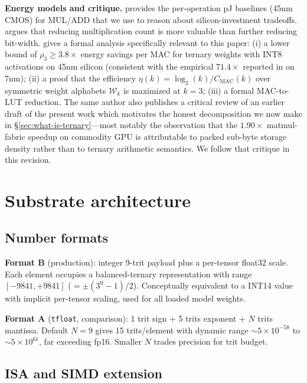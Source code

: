 \documentclass{article}
\begin{document}
\textbf{Energy models and critique.} \citet{horowitz-energy-2014}
provides the per-operation pJ baselines (45nm {CMOS}) for {MUL}/{ADD}
that we use to reason about silicon-investment tradeoffs.
\citet{prom-2025} argues that reducing multiplication count is more
valuable than further reducing bit-width.
\citet{cuevas-formal-2026} gives a formal analysis specifically
relevant to this paper: (i) a lower bound of $\rho_3 \geq 3.8\times$
energy savings per {MAC} for ternary weights with INT8 activations on
45nm silicon (consistent with the empirical $71.4\times$ reported in
\citep{bitnet158-2024} on 7nm); (ii) a proof that the efficiency
$\eta(k) = \log_2(k) / C_{\mathrm{MAC}}(k)$ over symmetric weight
alphabets $\mathcal{W}_k$ is maximized at $k=3$; (iii) a formal
{MAC}-to-{LUT} reduction. The same author also publishes a critical
review of an earlier draft of the present work which motivates the
honest decomposition we now make in
\S\ref{sec:what-is-ternary}---most notably the observation that the
$1.90\times$ matmul-fabric speedup on commodity {GPU} is attributable
to packed sub-byte storage density rather than to ternary arithmetic
semantics. We follow that critique in this revision.

\section{Substrate architecture}
\label{sec:architecture}

\subsection{Number formats}

\textbf{Format B} (production): integer 9-trit payload plus a
per-tensor float32 scale. Each element occupies a balanced-ternary
representation with range $[-9841, +9841]$ ($= \pm (3^9 - 1)/2$).
Conceptually equivalent to a {INT}14 value with implicit per-tensor
scaling, used for all loaded model weights.

\textbf{Format A} (\texttt{tfloat}, comparison): 1 trit sign + 5 trits
exponent + $N$ trits mantissa. Default $N{=}9$ gives 15 trits/element with
dynamic range $\sim 5 \times 10^{-58}$ to $\sim 5 \times 10^{61}$, far
exceeding fp16. Smaller $N$ trades precision for trit budget.

\subsection{ISA and {SIMD} extension}
\end{document}
